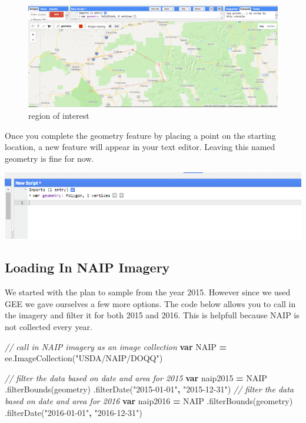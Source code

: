 \documentclass[]{article}
\newenvironment{Shaded}{\begin{snugshade}}{\end{snugshade}}
\newcommand{\KeywordTok}[1]{\textcolor[rgb]{0.13,0.29,0.53}{\textbf{#1}}}
\newcommand{\StringTok}[1]{\textcolor[rgb]{0.31,0.60,0.02}{#1}}
\newcommand{\CommentTok}[1]{\textcolor[rgb]{0.56,0.35,0.01}{\textit{#1}}}
\newcommand{\VariableTok}[1]{\textcolor[rgb]{0.00,0.00,0.00}{#1}}
\newcommand{\OperatorTok}[1]{\textcolor[rgb]{0.81,0.36,0.00}{\textbf{#1}}}
\newcommand{\AttributeTok}[1]{\textcolor[rgb]{0.77,0.63,0.00}{#1}}
\newcommand{\NormalTok}[1]{#1}
\begin{document}
\begin{figure}
\centering
\includegraphics{Make_Geometry_ScreenShot1.png}
\caption{region of interest}
\end{figure}

 Once you complete the geometry feature by placing a point on the
starting location, a new feature will appear in your text editor.
Leaving this named geometry is fine for now.

\includegraphics{geometryImport.png}

\subsection{Loading In NAIP Imagery}\label{loading-in-naip-imagery}

We started with the plan to sample from the year 2015. However since we
used GEE we gave ourselves a few more options. The code below allows you
to call in the imagery and filter it for both 2015 and 2016. This is
helpfull because NAIP is not collected every year.

\begin{Shaded}
\begin{Highlighting}[]
\CommentTok{// call in NAIP imagery as an image collection}
\KeywordTok{var}\NormalTok{ NAIP }\OperatorTok{=} \VariableTok{ee}\NormalTok{.}\AttributeTok{ImageCollection}\NormalTok{(}\StringTok{"USDA/NAIP/DOQQ"}\NormalTok{)}

\CommentTok{// filter the data based on date and area for 2015}
\KeywordTok{var}\NormalTok{ naip2015 }\OperatorTok{=}\NormalTok{ NAIP}
\NormalTok{  .}\AttributeTok{filterBounds}\NormalTok{(geometry)}
\NormalTok{  .}\AttributeTok{filterDate}\NormalTok{(}\StringTok{"2015-01-01"}\OperatorTok{,} \StringTok{"2015-12-31"}\NormalTok{)}
\CommentTok{// filter the data based on date and area for 2016}
\KeywordTok{var}\NormalTok{ naip2016 }\OperatorTok{=}\NormalTok{ NAIP}
\NormalTok{  .}\AttributeTok{filterBounds}\NormalTok{(geometry)}
\NormalTok{  .}\AttributeTok{filterDate}\NormalTok{(}\StringTok{"2016-01-01"}\OperatorTok{,} \StringTok{"2016-12-31"}\NormalTok{)}
\end{Highlighting}
\end{Shaded}
\end{document}
